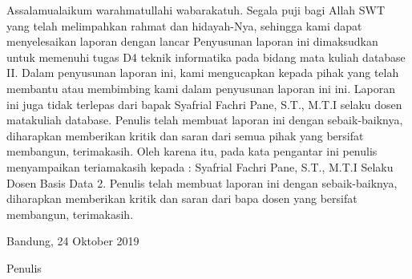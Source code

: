 \begin{acknowledgements}
Assalamualaikum warahmatullahi wabarakatuh. Segala puji bagi Allah SWT yang telah melimpahkan rahmat dan hidayah-Nya, sehingga kami dapat menyelesaikan laporan dengan lancar
Penyusunan laporan ini dimaksudkan untuk memenuhi tugas D4 teknik informatika pada bidang mata kuliah database II. Dalam penyusunan laporan ini, kami mengucapkan kepada pihak yang telah membantu atau membimbing kami dalam penyusunan laporan ini ini. Laporan ini juga tidak terlepas dari bapak Syafrial Fachri Pane, S.T., M.T.I selaku dosen matakuliah database. Penulis telah membuat laporan ini dengan sebaik-baiknya, diharapkan memberikan kritik dan saran dari semua pihak yang bersifat membangun, terimakasih.
Oleh karena itu, pada kata pengantar ini penulis menyampaikan teriamakasih kepada : Syafrial Fachri Pane, S.T., M.T.I Selaku Dosen Basis Data 2.
Penulis telah membuat laporan ini dengan sebaik-baiknya, diharapkan memberikan kritik dan saran dari bapa dosen yang bersifat membangun, terimakasih.

\begin{raggedleft}
\vspace{9ex}
Bandung, 24 Oktober 2019

Penulis

\end{raggedleft}

\end{acknowledgements}